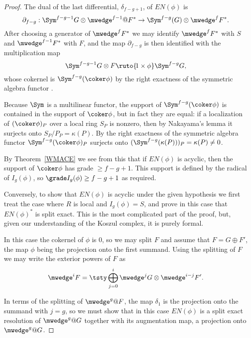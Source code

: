 \begin{proof}
The dual of the last differential, $\delta_{f-g+1}$, of $EN(\phi)$ is
$$
\partial_{f-g}: \Sym^{f-g-1}G \otimes \mwedge^{f-1}@F^{*} \to
\Sym^{f-g}(G) \otimes \mwedge^{f}F^{*}.
$$
After choosing a generator of $\mwedge^{f}F^{*}$ we
may identify $\mwedge^{f}F^{*}$ with $S$ and $\mwedge^{f-1}F^{*}$ with $F$,
and the map $\partial_{f-g}$
is then identified with the multiplication map
$$
\Sym^{f-g-1}G \otimes F \ruto {\!1\times \phi} \Sym^{f-g}G
,
$$
whose cokernel is $\Sym^{f-g}(\coker \phi)$ by the right exactness of
the symmetric algebra functor \cite[Proposition A2.2]{Eisenbud1995}. 

Because $\Sym$ is a multilinear functor,
the
support of $\Sym^{f-g}(\coker \phi)$ is contained in the support
of $\coker \phi$, but in fact they are equal:
if a localization of
$(\coker \phi)_P$ over a local ring $S_{P}$
is nonzero, then by
Nakayama's lemma
it surjects onto $S_{P}/P_{P} = \kappa(P)$. By
%
the right exactness
of the symmetric algebra functor $\Sym^{f-g}(\coker \phi)_{P}$ surjects
onto
$(\Sym^{f-g}(\kappa(P)))_P = \kappa(P)\neq 0$. 

By Theorem~\ref{WMACE} we see from this that if $EN(\phi)$ is acyclic,
then the support of $\coker \phi$
has grade $\geq f-g+1$. This support is defined by the radical of
$I_{g}(\phi)$, so $\grade I_{g}(\phi)\geq f-g+1$ as required.

Conversely, to show that $EN(\phi)$ is acyclic under the given hypothesis
we first treat the case where $R$ is local and 
$I_{g}(\phi) = S$, and prove in this case that $EN(\phi)^{*}$ is split exact. This
is the most complicated part of the proof,
but, given our understanding of the Koszul complex, it is purely formal.

In this case the cokernel of $\phi$ is 0, so we may split $F$ and
assume that $F = G\oplus F'$, the map $\phi$ being the projection onto
the first summand. Using the splitting of $F$ we may write
the exterior powers of $F$ as  
$$
\mwedge^{i}F =\tsty\bigoplus\limits_{j=0}^{i}\mwedge^{j}G\otimes \mwedge^{i-j}F'.
$$

In terms of the splitting of $\mwedge^{g}@F$, the map $\delta_{1}$ 
is the projection onto the  summand with $j=g$, so we must show that
in this case
 $EN(\phi)$ is a split exact resolution of $\mwedge^{g}@G$ together with
 its augmentation map, a projection onto $\mwedge^{g}@G$.
 

\end{proof}
